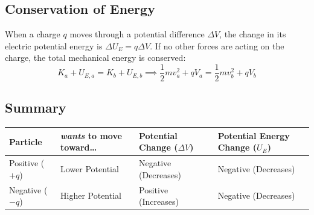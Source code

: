 \subsection{Conservation of Energy}
When a charge $q$ moves through a potential difference $\Delta V$, the change in its electric potential energy is $\Delta U_E = q\Delta V$. If no other forces are acting on the charge, the total mechanical energy is conserved:
\begin{equation}
    K_a + U_{E,a} = K_b + U_{E,b} \implies \frac{1}{2}mv_a^2 + qV_a = \frac{1}{2}mv_b^2 + qV_b
\end{equation}
\subsection{Summary}
\begin{table}[H]
    \centering
    \begin{tabular}{|l|l|l|l|}
    \hline
        Particle & \textit{wants} to move toward\dots & Potential Change ($\Delta V$) & Potential Energy Change ($U_E$​) \\ \hline
        Positive ($+q$) & Lower Potential & Negative (Decreases) & Negative (Decreases) \\ \hline
        Negative ($-q$) & Higher Potential & Positive (Increases) & Negative (Decreases) \\ \hline
    \end{tabular}
\end{table}

